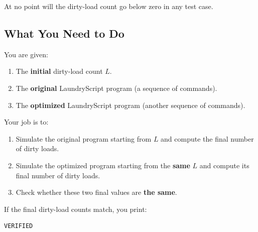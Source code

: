 At no point will the dirty-load count go below zero in any test case.

\subsection*{What You Need to Do}

You are given:
\begin{enumerate}[label=\arabic*., leftmargin=*]
    \item The \textbf{initial} dirty-load count \(L\).
    \item The \textbf{original} LaundryScript program (a sequence of commands).
    \item The \textbf{optimized} LaundryScript program (another sequence of
    commands).
\end{enumerate}

Your job is to:
\begin{enumerate}[label=\arabic*., leftmargin=*]
    \item Simulate the original program starting from \(L\) and compute the
    final number of dirty loads.
    \item Simulate the optimized program starting from the \textbf{same} \(L\)
    and compute its final number of dirty loads.
    \item Check whether these two final values are \textbf{the same}.
\end{enumerate}

If the final dirty-load counts match, you print:
\begin{verbatim}
VERIFIED
\end{verbatim}
